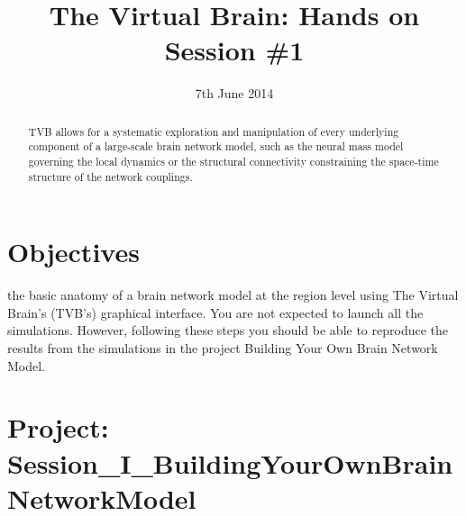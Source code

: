 \documentclass{tufte-handout}
\title{The Virtual Brain: Hands on Session \#1}
\date{7th June 2014}
\begin{document}

\newpage
\ClearWallPaper
\begin{abstract}
\noindent TVB allows for a systematic exploration and manipulation of every
underlying component of a large-scale brain network model, such as the neural
mass model governing the local dynamics  or the structural connectivity
constraining the space-time structure of the network couplings.
\begin{marginfigure}%
  \label{fig:marginfig}
\end{marginfigure}
\end{abstract}



\section{Objectives}\label{sec:objectives}

 the basic anatomy of a brain network model at the region level using The
Virtual Brain's (TVB's) graphical interface. You are not expected to launch all the simulations. However, following these steps you should
be able to reproduce the results from the simulations in the project Building
Your Own Brain Network Model. 

\section{Project:  Session\_I\_BuildingYourOwnBrainNetworkModel}\label{sec:project_data}
\end{document}
